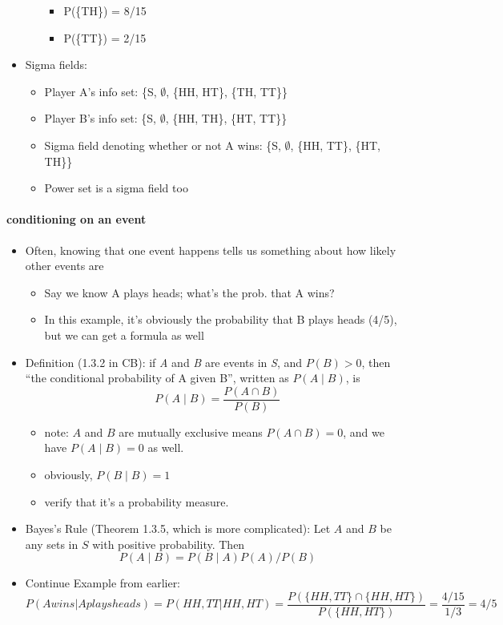 \begin{itemize}
\begin{itemize}
\begin{itemize}
\item P(\{TH\}) = 8/15
\item P(\{TT\}) = 2/15
\end{itemize}
\end{itemize}
\item Sigma fields:
\begin{itemize}
\item Player A's info set: \{S, $\emptyset$, \{HH, HT\}, \{TH, TT\}\}
\item Player B's info set: \{S, $\emptyset$, \{HH, TH\}, \{HT, TT\}\}
\item Sigma field denoting whether or not A wins: 
          \{S, $\emptyset$, \{HH, TT\}, \{HT, TH\}\}
\item Power set is a sigma field too
\end{itemize}
\end{itemize}
\paragraph{conditioning on an event}
\label{sec-1-2-2}

\begin{itemize}
\item Often, knowing that one event happens tells us something about
        how likely other events are
\begin{itemize}
\item Say we know A plays heads; what's the prob. that A wins?
\item In this example, it's obviously the probability that B plays
          heads (4/5), but we can get a formula as well
\end{itemize}
\item Definition (1.3.2 in CB): if \emph{A} and \emph{B} are events in \emph{S},
        and $P(B) > 0$, then ``the conditional probability of A given
        B'', written as $P(A \mid B)$, is
        \[P(A \mid B) = \frac{P(A \cap B)}{P(B)}\]
\begin{itemize}
\item note: $A$ and $B$ are mutually exclusive means $P(A \cap
          B) = 0$, and we have $P(A \mid B) = 0$ as well.
\item obviously, $P(B \mid B) = 1$
\item verify that it's a probability measure.
\end{itemize}
\item Bayes's Rule (Theorem 1.3.5, which is more complicated):
        Let $A$ and $B$ be any sets in $S$ with positive probability.
        Then \[P(A \mid B) = P(B \mid A) P(A) / P(B)\]
\item Continue Example from earlier:
        \[P(A wins | A plays heads) = P({HH, TT} | {HH, HT}) =
        \frac{P(\{HH, TT\} \cap \{HH, HT\})}{P(\{HH, HT\})} =
        \frac{4/15}{1/3} = 4/5\]
\end{itemize}
